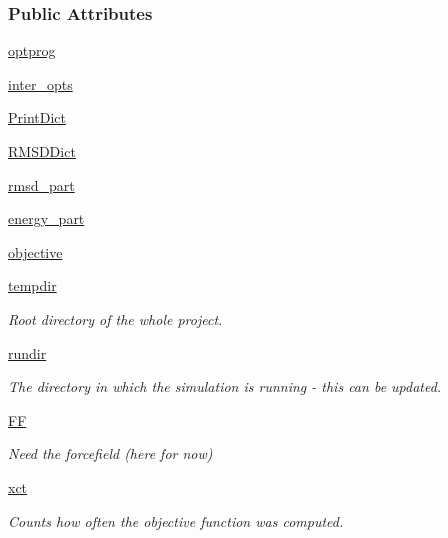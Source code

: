 \subsubsection*{Public Attributes}
\begin{DoxyCompactItemize}
\item 
\hyperlink{classforcebalance_1_1tinkerio_1_1BindingEnergy__TINKER_a559266d15507b16eebd56f38c6b588f6}{optprog}
\item 
\hyperlink{classforcebalance_1_1binding_1_1BindingEnergy_a9d1f28fc62222da17c0fd12593042f10}{inter\-\_\-opts}
\item 
\hyperlink{classforcebalance_1_1binding_1_1BindingEnergy_ae88e256776152d847fd3c5d8609a5c6d}{Print\-Dict}
\item 
\hyperlink{classforcebalance_1_1binding_1_1BindingEnergy_a5f2f2a25d42e1b27f17fa7b289f0dd26}{R\-M\-S\-D\-Dict}
\item 
\hyperlink{classforcebalance_1_1binding_1_1BindingEnergy_a9503044f7d14bfd9f8dc98dbe7950685}{rmsd\-\_\-part}
\item 
\hyperlink{classforcebalance_1_1binding_1_1BindingEnergy_a4efa69b8f81d993b58851650d9b5ef89}{energy\-\_\-part}
\item 
\hyperlink{classforcebalance_1_1binding_1_1BindingEnergy_a58ccde0bd9924fe6799acac8e1d2eadf}{objective}
\item 
\hyperlink{classforcebalance_1_1target_1_1Target_aa1f01b5b78db253b5b66384ed11ed193}{tempdir}
\begin{DoxyCompactList}\small\item\em Root directory of the whole project. \end{DoxyCompactList}\item 
\hyperlink{classforcebalance_1_1target_1_1Target_a6872de5b2d4273b82336ea5b0da29c9e}{rundir}
\begin{DoxyCompactList}\small\item\em The directory in which the simulation is running -\/ this can be updated. \end{DoxyCompactList}\item 
\hyperlink{classforcebalance_1_1target_1_1Target_a38a37919783141ea37fdcf8b00ce0aaf}{F\-F}
\begin{DoxyCompactList}\small\item\em Need the forcefield (here for now) \end{DoxyCompactList}\item 
\hyperlink{classforcebalance_1_1target_1_1Target_aad2e385cfbf7b4a68f1c2cb41133fe82}{xct}
\begin{DoxyCompactList}\small\item\em Counts how often the objective function was computed. \end{DoxyCompactList}\item 

\end{DoxyCompactItemize}
